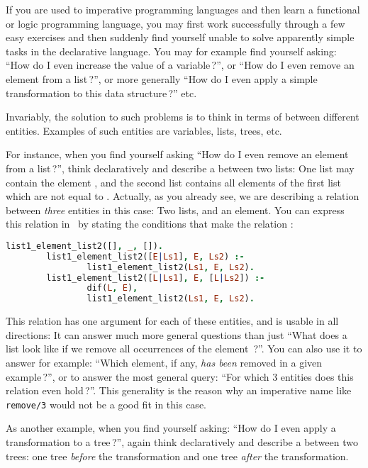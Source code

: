 
If you are used to imperative programming languages and then learn a functional
or logic programming language, you may first work successfully through a few
easy exercises and then suddenly find yourself unable to solve apparently simple
tasks in the declarative language. You may for example find yourself asking:
``How do I even increase the value of a variable\,?'', or ``How do I even remove
an element from a list\,?'', or more generally ``How do I even apply a simple
transformation to this data structure\,?'' etc.

Invariably, the solution to such problems is to think in terms of
 between different entities. Examples of such entities are
variables, lists, trees,  etc.

For instance, when you find yourself asking ``How do I even remove an element
 from a list\,?'', think declaratively and describe a 
between two lists: One list may contain the element , and the second list
contains all elements of the first list which are not equal to .
Actually, as you already see, we are describing a relation between \emph{three}
entities in this case: Two lists, and an element. You can express this relation
in \prolog\ by stating the conditions that make the relation :
\begin{lstlisting}[language=prolog]
        list1_element_list2([], _, []).
        list1_element_list2([E|Ls1], E, Ls2) :-
                list1_element_list2(Ls1, E, Ls2).
        list1_element_list2([L|Ls1], E, [L|Ls2]) :-
                dif(L, E),
                list1_element_list2(Ls1, E, Ls2).
\end{lstlisting}
                
This relation has one argument for each of these entities, and is usable in all
directions: It can answer much more general questions than just ``What does a
list look like if we remove all occurrences of the element \,?''. You can
also use it to answer for example: ``Which element, if any, \emph{has been}
removed in a given example\,?'', or to answer the most general query: ``For
which 3 entities does this relation even hold\,?''. This generality is the
reason why an imperative name like \verb"remove/3" would not be a good fit in
this case.

As another example, when you find yourself asking: ``How do I even apply a
transformation to a tree\,?'', again think declaratively and describe a
 between two trees: one tree \emph{before} the transformation and
one tree \emph{after} the transformation.

